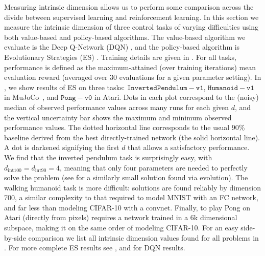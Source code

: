 \documentclass{article} %
\newcommand{\dintn}{d_{\mathrm{int90}}}
\newcommand{\dinto}{d_{\mathrm{int100}}}
\begin{document}

Measuring intrinsic dimension allows us to perform some comparison across the divide between supervised learning and reinforcement learning.
In this section we measure the intrinsic dimension of three control tasks of varying difficulties using both value-based
and policy-based algorithms. The value-based algorithm we evaluate is the Deep Q-Network (DQN) \citep{mnih2013playing-atari-with}, and the policy-based algorithm is Evolutionary Strategies (ES) \citep{salimans-2017-arXiv-evolution-strategies-as-a-scalable}. Training details are given in .
%
For all tasks, performance is defined as the maximum-attained (over training iterations) mean evaluation reward (averaged over 30 evaluations for a given parameter setting). In , we show results of ES on three tasks:
$\mathtt{InvertedPendulum\!-\!v1}$, $\mathtt{Humanoid\!-\!v1}$ in MuJoCo~\citep{todorov2012mujoco}, and $\mathtt{Pong\!-\!v0}$ in Atari.
Dots in each plot correspond to the (noisy) median of observed performance values across many runs for each given $d$, and the vertical uncertainty bar shows the maximum and minimum observed performance values. The dotted horizontal line corresponds to the usual 90\% baseline derived from the best directly-trained network (the solid horizontal line). A dot is darkened signifying the first $d$ that allows a satisfactory performance. We find that the inverted pendulum task is surprisingly easy, with $\dinto=\dintn=4$, meaning that only four parameters are needed to perfectly solve the problem (see \cite{stanley-2002-EvoComp-evolving-neural-networks} for a similarly small solution found via evolution).
The walking humanoid task is more difficult: solutions are found reliably by dimension 700, a similar complexity to that required to model MNIST with an FC network, and far less than modeling CIFAR-10 with a convnet. Finally, to play Pong on Atari (directly from pixels) requires a network trained in a 6k dimensional subspace, making it on the same order of modeling CIFAR-10. For an easy side-by-side comparison we list all intrinsic dimension values found for all problems in .
For more complete ES results see , and  for DQN results.
\end{document}

